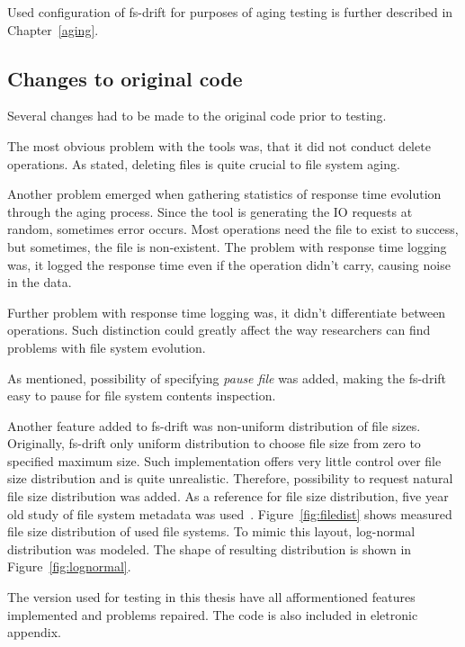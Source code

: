 \documentclass[
  color, %
  table, %
  lof,   %
  lot,   %
]{fithesis3}
\begin{document}
Used configuration of fs-drift for purposes of aging testing is further described in Chapter~\ref{aging}.

\subsection{Changes to original code}
\label{text:fsdrift_changes}
Several changes had to be made to the original code prior to testing.

The most obvious problem with the tools was, that it did not conduct delete operations. As stated, deleting files is quite crucial to file system aging.

Another problem emerged when gathering statistics of response time evolution through the aging process. Since the tool is generating the IO requests at random, sometimes error occurs. Most operations need the file to exist to success, but sometimes, the file is non-existent. The problem with response time logging was, it logged the response time even if the operation didn't carry, causing noise in the data.

Further problem with response time logging was, it didn't differentiate between operations. Such distinction could greatly affect the way researchers can find problems with file system evolution.

As mentioned, possibility of specifying \emph{pause file} was added, making the fs-drift easy to pause for file system contents inspection.

Another feature added to fs-drift was non-uniform distribution of file sizes. Originally, fs-drift only uniform distribution to choose file size from zero to specified maximum size. Such implementation offers very little control over file size distribution and is quite unrealistic. Therefore, possibility to request natural file size distribution was added. As a reference for file size distribution, five year old study of file system metadata was used~\cite{agrawal2007five}. Figure~\ref{fig:filedist} shows measured file size distribution of used file systems. To mimic this layout, log-normal distribution was modeled. The shape of resulting distribution is shown in Figure~\ref{fig:lognormal}.

The version used for testing in this thesis have all afformentioned features implemented and problems repaired. The code is also included in eletronic appendix.
\end{document}
